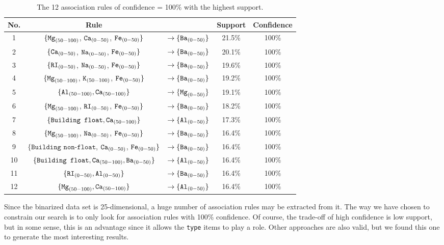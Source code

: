 \begin{table}[H]
\centering
\begin{tabular}{c c l c c}
    No. & Rule  & & Support & Confidence  \\ \hline
    1   &$\{\texttt{Mg}_{(50-100)}$, $\texttt{Ca}_{(0-50)}$, $\texttt{Fe}_{(0-50)} \}$ &$\rightarrow\{\texttt{Ba}_{(0-50)}\}$ 
    & 21.5\% & 100\% \\
    2   &$\{\texttt{Ca}_{(0-50)}$, $\texttt{Na}_{(0-50)}$, $\texttt{Fe}_{(0-50)} \}$ &$\rightarrow\{\texttt{Ba}_{(0-50)}\}$ 
    & 20.1\% & 100\% \\
    3   &$\{\texttt{RI}_{(0-50)}$, $\texttt{Na}_{(0-50)}$, $\texttt{Fe}_{(0-50)} \}$ &$\rightarrow\{\texttt{Ba}_{(0-50)}\}$ 
    & 19.6\% & 100\% \\
    4   &$\{\texttt{Mg}_{(50-100)}$, $\texttt{K}_{(50-100)}$, $\texttt{Fe}_{(0-50)} \}$ &$\rightarrow\{\texttt{Ba}_{(0-50)}\}$ 
    & 19.2\% & 100\% \\
    5   &$\{ \texttt{Al}_{(50-100)}, \texttt{Ca}_{(50-100)} \}$  &$\rightarrow \{ \texttt{Mg}_{(0-50)} \} $
    & 19.1\% & 100\% \\
    6   &$\{\texttt{Mg}_{(50-100)}$, $\texttt{RI}_{(0-50)}$, $\texttt{Fe}_{(0-50)} \}$ &$\rightarrow\{\texttt{Ba}_{(0-50)}\}$ 
    & 18.2\% & 100\% \\ 
    7   &$\{ \texttt{Building float}, \texttt{Ca}_{(50-100)} \}$ &$\rightarrow \{ \texttt{Al}_{(0-50)} \} $
    & 17.3\% & 100\% \\
    8   &$\{\texttt{Mg}_{(50-100)}$, $\texttt{Na}_{(0-50)}$, $\texttt{Fe}_{(0-50)} \}$ &$\rightarrow\{\texttt{Ba}_{(0-50)}\}$ 
    & 16.4\% & 100\% \\
    9   &$\{\texttt{Building non-float}$, $\texttt{Ca}_{(0-50)}$, $\texttt{Fe}_{(0-50)} \}$ &$\rightarrow\{\texttt{Ba}_{(0-50)}\}$ 
    & 16.4\% & 100\% \\
    10  &$\{\texttt{Building float}, \texttt{Ca}_{(50-100)}, \texttt{Ba}_{(0-50)} \}$ &$\rightarrow \{\texttt{Al}_{(0-50)}\}$
    & 16.4\% & 100\% \\
    11  &$\{ \texttt{RI}_{(0-50)}, \texttt{Al}_{(0-50)} \}$ &$\rightarrow \{ \texttt{Ba}_{(0-50)} \} $
    & 16.4\% & 100\% \\
    12  &$\{ \texttt{Mg}_{(50-100)}, \texttt{Ca}_{(50-100)} \}$ &$\rightarrow \{ \texttt{Al}_{(0-50)} \} $
    & 16.4\% & 100\% \\
\end{tabular}
\caption{The 12 association rules of confidence = 100\% with the highest support.}
\label{tab:assoc-rules}
\end{table}
Since the binarized data set is 25-dimensional, a huge number of association rules may be extracted from it. The way we have chosen to constrain our search is to only look for association rules with 100\% confidence. Of course, the trade-off of high confidence is low support, but in some sense, this is an advantage since it allows the \texttt{type} items to play a role. Other approaches are also valid, but we found this one to generate the most interesting results.

